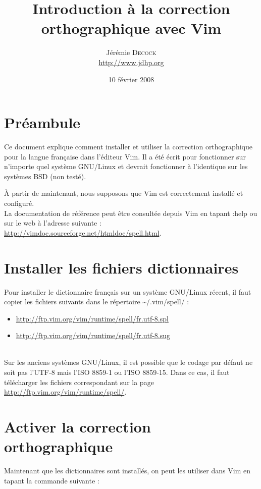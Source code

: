\documentclass{article}
\title{Introduction à la correction orthographique avec Vim}
\author{Jérémie \textsc{Decock} \\ \url{http://www.jdhp.org}}
\date{10 février 2008}
\begin{document}
\maketitle

\section{Préambule}
Ce document explique comment installer et utiliser la correction orthographique
pour la langue française dans l'éditeur Vim. Il a été écrit pour fonctionner
sur n'importe quel système GNU/Linux et devrait fonctionner à l'identique sur
les systèmes BSD (non testé).

À partir de maintenant, nous supposons que Vim est correctement installé et
configuré.\\

La documentation de référence peut être consultée depuis Vim en tapant
\og{}:help\fg{} ou sur le web à l'adresse suivante :
\url{http://vimdoc.sourceforge.net/htmldoc/spell.html}.


\section{Installer les fichiers dictionnaires}
Pour installer le dictionnaire français sur un système GNU/Linux récent, il
faut copier les fichiers suivants dans le répertoire
\textasciitilde{}/.vim/spell/ :
\begin{itemize}
	\item \url{http://ftp.vim.org/vim/runtime/spell/fr.utf-8.spl}
	\item \url{http://ftp.vim.org/vim/runtime/spell/fr.utf-8.sug}
\end{itemize}
~\\
Sur les anciens systèmes GNU/Linux, il est possible que le codage par défaut ne
soit pas l'UTF-8 mais l'ISO 8859-1 ou l'ISO 8859-15. Dans ce cas, il faut
télécharger les fichiers correspondant sur la page
\url{http://ftp.vim.org/vim/runtime/spell/}.


\section{Activer la correction orthographique}
Maintenant que les dictionnaires sont installés, on peut les utiliser dans Vim
en tapant la commande suivante :
\end{document}
